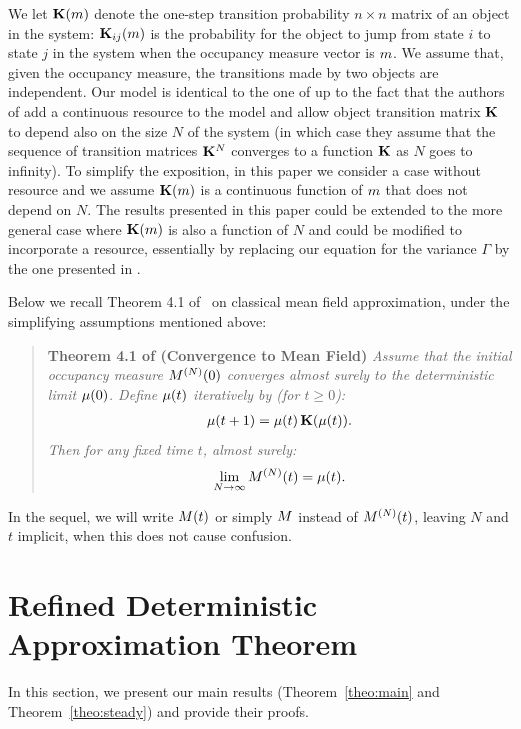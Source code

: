 \documentclass{amsart}
\begin{document}
We let $\mathbf{K}(m)$ denote the one-step transition probability
$n \times n$ matrix of an object in the system: $\mathbf{K}_{ij}(m)$
is the probability for the object to jump from state $i$ to state $j$
in the system when the occupancy measure vector is $m$. We assume
that, given the occupancy measure, the transitions made by two objects
are independent. Our model is identical to the one of \cite{Le+07} up
to the fact that the authors of \cite{Le+07} add a continuous resource
to the model and allow object transition matrix $\mathbf{K}$ to depend also on
the size $N$ of the system (in which case they assume
that the sequence of transition matrices $\mathbf{K}^N$ converges to a function
$\mathbf{K}$ as $N$ goes to infinity). To simplify the exposition, in this
paper we consider a case without resource and we assume
$\mathbf{K}(m)$ is a continuous function of $m$ that does not
depend on $N$. The results presented in this paper could be extended
to the more general case where $\mathbf{K}(m)$ is also a function of
$N$ and could be modified to incorporate a resource, essentially by
replacing our equation for the variance $\Gamma$ by the one presented
in \cite[Equation~(7)]{gastgaujalDEDS}.

Below we recall Theorem 4.1 of~\cite{Le+07} on classical mean field
approximation, under the simplifying assumptions mentioned above:

\begin{quotation}
\noindent
{\bf Theorem 4.1 of \cite{Le+07} (Convergence to Mean Field)}
{\em Assume that the initial occupancy measure $M^{(N)}(0)$ converges almost surely to the deterministic limit $\mu(0)$. 
Define $\mu(t)$ iteratively by (for $t \geq 0$):
\begin{align}
  \label{eq:mu}
  \mu(t+1) = \mu(t) \, \mathbf{K}(\mu(t)).
\end{align}
Then for any fixed time $t$, almost surely:
$$
\lim_{N \to \infty} M^{(N)}(t) = \mu(t).
$$
}
\end{quotation}
In the sequel, we will write $M(t)$ or simply $M$ instead of
$M^{(N)}(t)$, leaving $N$ and $t$ implicit, when this does not cause
confusion.

\section{Refined Deterministic Approximation Theorem}
\label{sect:Refined}


In this section, we present our main results (Theorem~\ref{theo:main}
and Theorem~\ref{theo:steady}) and provide their proofs.
\end{document}
